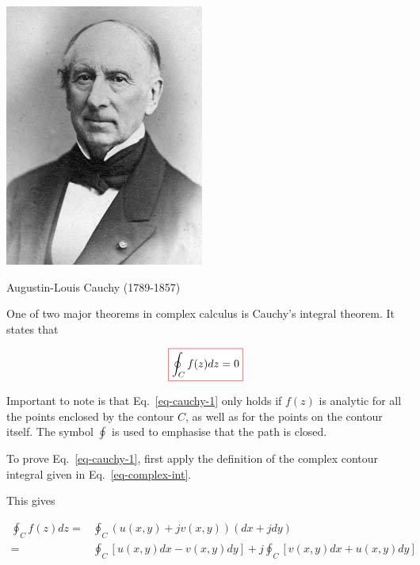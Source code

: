 
\begin{marginfigure}[+0.0cm]
  \includegraphics{complex/figures/cauchy}
  \caption{Augustin-Louis Cauchy (1789-1857)}
\end{marginfigure}

One of two major theorems in complex calculus is Cauchy's integral theorem. It states that 

\begin{equation}
\fbox{$\displaystyle
\oint_{{C}} f(z) dz = 0 \label{eq-cauchy-1}
$}
\end{equation}

Important to note is that Eq.~\ref{eq-cauchy-1} only holds if $f(z)$ is analytic for all the points enclosed by the contour ${C}$, as well as for the points on the contour itself. The symbol $\oint$ is used to emphasise that the path is closed.

\begin{cue}
To prove Eq.~\ref{eq-cauchy-1}, first apply the definition of the complex contour integral given in Eq.~\ref{eq-complex-int}.
\end{cue}

This gives

\begin{align}
\oint_{C}f(z)dz = & \oint_{C}\left(u(x,y)+jv(x,y)\right)(dx+jdy)
\nonumber \\
= & \oint_{C}\left[u(x,y)dx-v(x,y)dy\right] + j
\oint_{C}\left[v(x,y)dx+u(x,y)dy\right]  \label{eq-cauchy-proof}
\end{align}

